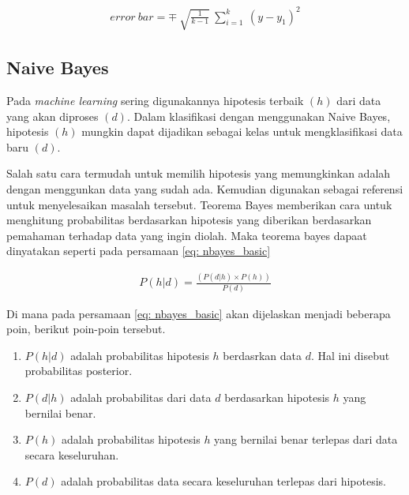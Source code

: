 \begin{subs}
\begin{enumerate}[label=\textbf{\alph*).}]
		\begin{equation}\label{eq: KNN_distance_weigh_std_dev}
		\begin{split}
		error\ bar = \mp\ \sqrt{\frac{1}{k - 1}}\ \sum_{i = 1}^{k}\ (y - y_{1})^2
		\end{split}
		\end{equation}
		
	\end{enumerate}
	
	\subsection{Naive Bayes}
	\label{sec:sub_sec2_bayes}
	\vspace{1ex}
	
	Pada \textit{machine learning} sering digunakannya hipotesis terbaik $(h)$ dari data yang akan diproses $(d)$. Dalam klasifikasi dengan menggunakan Naive Bayes, hipotesis $(h)$ mungkin dapat dijadikan sebagai kelas untuk mengklasifikasi data baru $(d)$.
	\vspace{1ex}
	
	Salah satu cara termudah untuk memilih hipotesis yang memungkinkan adalah dengan menggunkan data yang sudah ada. Kemudian digunakan sebagai referensi untuk menyelesaikan masalah tersebut. Teorema Bayes memberikan cara untuk menghitung probabilitas berdasarkan hipotesis yang diberikan berdasarkan pemahaman terhadap data yang ingin diolah. Maka teorema bayes dapaat dinyatakan seperti pada persamaan \ref{eq: nbayes_basic}
	
	\begin{equation}\label{eq: nbayes_basic}
	\begin{split}
	P(h|d) = \frac{(P(d|h) \times P(h))}{P(d)}
	\end{split}
	\end{equation}
	
	Di mana pada persamaan \ref{eq: nbayes_basic} akan dijelaskan menjadi beberapa poin, berikut poin-poin tersebut.
	
	\begin{enumerate}
		\item $P(h|d)$ adalah probabilitas hipotesis $h$ berdasrkan data $d$. Hal ini disebut probabilitas posterior.
		\item $P(d|h)$ adalah probabilitas dari data $d$ berdasarkan hipotesis $h$ yang bernilai benar.
		\item $P(h)$ adalah probabilitas hipotesis $h$ yang bernilai benar terlepas dari data secara keseluruhan.
		\item $P(d)$ adalah probabilitas data secara keseluruhan terlepas dari hipotesis.
	\end{enumerate}
	

\end{subs}
